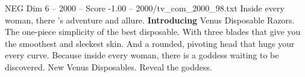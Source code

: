 \begin{textsample}{NEG Dim 6 – 2000 – Score -1.00 – 2000/tv\_com\_2000\_98.txt}  \label{ex:f6_neg_011}
Inside every woman, there 's adventure and allure. \textbf{Introducing} Venus Disposable Razors.
The one-piece simplicity of the best disposable.
With three blades that give you the smoothest and sleekest skin.
And a rounded, pivoting head that hugs your every curve.
Because inside every woman, there is a goddess waiting to be discovered.
New Venus Disposables.
Reveal the goddess.

\end{textsample}
